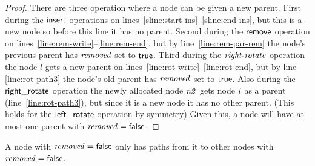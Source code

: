 \begin{proof}
There are three operation where a node can be given a new parent.
First during the $\act{insert}$ operations on lines~\ref{sline:start-ins}--\ref{sline:end-ins}, but this is a new node so before this line it has no parent.
Second during the $\act{remove}$ operation on lines~\ref{line:rem-write}--\ref{line:rem-end}, but by line~\ref{line:rem-par-rem} the node's previous parent has $\ms{removed}$ set to $\lit{true}$.
Third during the $\ms{right-rotate}$ operation the node $l$ gets a new parent on lines~\ref{line:rot-write}--\ref{line:rot-end}, but by line \ref{line:rot-path3} the node's old parent has $\ms{removed}$ set to $\lit{true}$.
Also during the $\act{right\_rotate}$ operation the newly allocated node $\ms{n2}$ gets node $\ms{l}$ as a parent (line~\ref{line:rot-path3}), but since it is a new node it has no other parent.
(This holds for the $\act{left\_rotate}$ operation by symmetry)
Given this, a node will have at most one parent with $\ms{removed}=\lit{false}$.
\end{proof}

\begin{lemma}
\label{lemma:false-rem}
A node with $\ms{removed}=\lit{false}$ only has paths from it to other nodes with $\ms{removed}=\lit{false}$.
\end{lemma}

